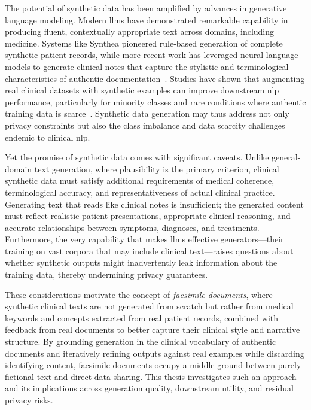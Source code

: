 The potential of synthetic data has been amplified by advances in generative language modeling. Modern \glspl{llm} have demonstrated remarkable capability in producing fluent, contextually appropriate text across domains, including medicine. Systems like Synthea pioneered rule-based generation of complete synthetic patient records, while more recent work has leveraged neural language models to generate clinical notes that capture the stylistic and terminological characteristics of authentic documentation~\citep{walonoski2018synthea}. Studies have shown that augmenting real clinical datasets with synthetic examples can improve downstream \gls{nlp} performance, particularly for minority classes and rare conditions where authentic training data is scarce~\citep{tang2023synthetic_clinical_llm, kumichev2024medsyn}. Synthetic data generation may thus address not only privacy constraints but also the class imbalance and data scarcity challenges endemic to clinical \gls{nlp}.

Yet the promise of synthetic data comes with significant caveats. Unlike general-domain text generation, where plausibility is the primary criterion, clinical synthetic data must satisfy additional requirements of medical coherence, terminological accuracy, and representativeness of actual clinical practice. Generating text that reads like clinical notes is insufficient; the generated content must reflect realistic patient presentations, appropriate clinical reasoning, and accurate relationships between symptoms, diagnoses, and treatments. Furthermore, the very capability that makes \glspl{llm} effective generators---their training on vast corpora that may include clinical text---raises questions about whether synthetic outputs might inadvertently leak information about the training data, thereby undermining privacy guarantees.

These considerations motivate the concept of \textit{facsimile documents}, where synthetic clinical texts are not generated from scratch but rather from medical keywords and concepts extracted from real patient records, combined with feedback from real documents to better capture their clinical style and narrative structure.
By grounding generation in the clinical vocabulary of authentic documents and iteratively refining outputs against real examples while discarding identifying content, facsimile documents occupy a middle ground between purely fictional text and direct data sharing.
This thesis investigates such an approach and its implications across generation quality, downstream utility, and residual privacy risks.

